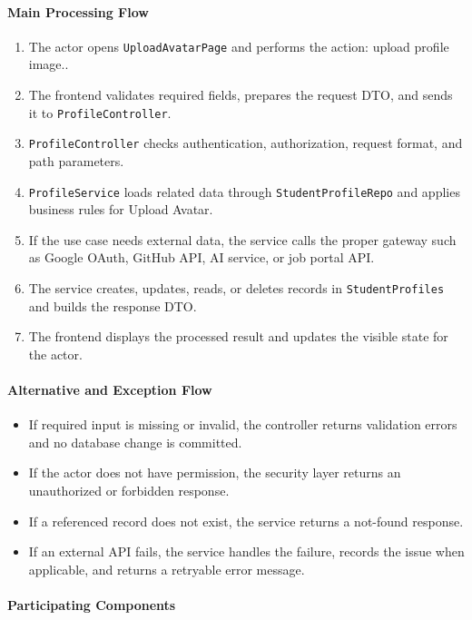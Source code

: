 \paragraph{Main Processing Flow}

\begin{enumerate}
    \item The actor opens \texttt{UploadAvatarPage} and performs the action: upload profile image..
    \item The frontend validates required fields, prepares the request DTO, and sends it to \texttt{ProfileController}.
    \item \texttt{ProfileController} checks authentication, authorization, request format, and path parameters.
    \item \texttt{ProfileService} loads related data through \texttt{StudentProfileRepo} and applies business rules for Upload Avatar.
    \item If the use case needs external data, the service calls the proper gateway such as Google OAuth, GitHub API, AI service, or job portal API.
    \item The service creates, updates, reads, or deletes records in \texttt{StudentProfiles} and builds the response DTO.
    \item The frontend displays the processed result and updates the visible state for the actor.
\end{enumerate}

\paragraph{Alternative and Exception Flow}

\begin{itemize}
    \item If required input is missing or invalid, the controller returns validation errors and no database change is committed.
    \item If the actor does not have permission, the security layer returns an unauthorized or forbidden response.
    \item If a referenced record does not exist, the service returns a not-found response.
    \item If an external API fails, the service handles the failure, records the issue when applicable, and returns a retryable error message.
\end{itemize}

\paragraph{Participating Components}

